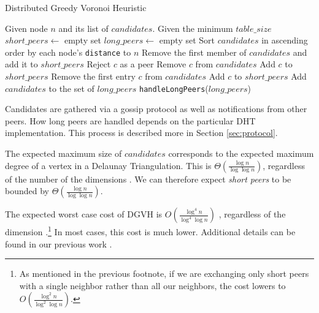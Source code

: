 \documentclass[11pt,conference]{IEEEtran}
\begin{document}
\begin{algorithm} %
	\caption{Distributed Greedy Voronoi Heuristic}
	\label{alg:dgvh}
	\small
	\begin{algorithmic}[1]  %
		\State Given node $n$ and its list of $candidates$.
		\State Given the minimum $table\_size$
		\State $short\_peers \leftarrow$ empty set%
		\State $long\_peers \leftarrow$ empty set %
		\State Sort $candidates$ in ascending order by each node's \texttt{distance} to $n$
		\State Remove the first member of $candidates$ and add it to $short\_peers$
				\State Reject $c$ as a peer
			\Else
				\State Remove $c$ from $candidates$
				\State Add $c$ to $short\_peers$
			\EndIf
		\EndFor
			\State Remove the first entry $c$ from $candidates$
			\State Add $c$ to $short\_peers$
		\EndWhile
		\State Add $candidates$ to the set of $long\_peers$	
		\State \texttt{handleLongPeers}($long\_peers$)
	\end{algorithmic}
\end{algorithm} 


Candidates are gathered via a gossip protocol as well as notifications from other peers.
How long peers are handled depends on the particular DHT implementation.
This process is described more in Section \ref{sec:protocol}.

The expected maximum size of $ candidates $ corresponds to the expected maximum degree of a vertex in a Delaunay Triangulation.
This is  $\Theta(\frac{\log n}{\log \log n} )$, regardless of the number of the dimensions \cite{bern1991expected}. 
We can therefore expect \textit{short peers} to be bounded by $\Theta(\frac{\log n}{\log \log n})$.

The expected worst case cost of DGVH is \(O(\frac{\log^{4} n}{\log^{4} \log n} )\) \cite{dgvh}, regardless of the dimension \cite{dgvh}.\footnote{As mentioned in the previous footnote, if we are exchanging only short peers with a single neighbor rather than all our neighbors, the cost lowers to \(O(\frac{\log^{2} n}{\log^{2} \log n} )\).}
In most cases, this cost is much lower.
Additional details can be found in our previous work \cite{dgvh}.
\end{document}

